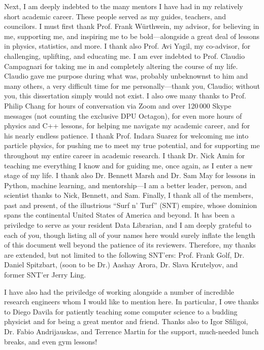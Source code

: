 \begin{acknowledgements}
Next, I am deeply indebted to the many mentors I have had in my relatively short academic career. 
These people served as my guides, teachers, and councilors. 
I must first thank Prof. Frank W\"urthwein, my advisor, for believing in me, supporting me, and inspiring me to be bold---alongside a great deal of lessons in physics, statistics, and more. 
I thank also Prof. Avi Yagil, my co-advisor, for challenging, uplifting, and educating me. 
I am ever indebted to Prof. Claudio Campagnari for taking me in and completely altering the course of my life. 
Claudio gave me purpose during what was, probably unbeknownst to him and many others, a very difficult time for me personally---thank you, Claudio; without you, this dissertation simply would not exist. 
I also owe many thanks to Prof. Philip Chang for hours of conversation via Zoom and over 120\,000 Skype messages (not counting the exclusive DPU Octagon), for even more hours of physics and C++ lessons, for helping me navigate my academic career, and for his nearly endless patience. 
I thank Prof. Indara Suarez for welcoming me into particle physics, for pushing me to meet my true potential, and for supporting me throughout my entire career in academic research. 
I thank Dr. Nick Amin for teaching me everything I know and for guiding me, once again, as I enter a new stage of my life. 
I thank also Dr. Bennett Marsh and Dr. Sam May for lessons in Python, machine learning, and mentorship---I am a better leader, person, and scientist thanks to Nick, Bennett, and Sam. 
Finally, I thank all of the members, past and present, of the illustrious ``Surf n' Turf'' (SNT) empire, whose dominion spans the continental United States of America and beyond. 
It has been a priviledge to serve as your resident Data Librarian, and I am deeply grateful to each of you, though listing all of your names here would surely inflate the length of this document well beyond the patience of its reviewers. 
Therefore, my thanks are extended, but not limited to the following SNT'ers: Prof. Frank Golf, Dr. Daniel Spitzbart, (soon to be Dr.) Aashay Arora, Dr. Slava Krutelyov, and former SNT'er Jerry Ling.

I have also had the priviledge of working alongside a number of incredible research engineers whom I would like to mention here. 
In particular, I owe thanks to Diego Davila for patiently teaching some computer science to a budding physicist and for being a great mentor and friend. 
Thanks also to Igor Sfiligoi, Dr. Fabio Andrijauskas, and Terrence Martin for the support, much-needed lunch breaks, and even gym lessons! 


\end{acknowledgements}
